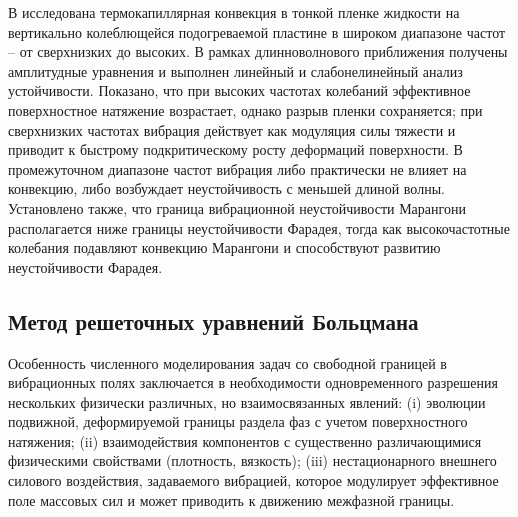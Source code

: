 \documentclass[12pt,a4paper]{article}
\begin{document}
В \cite{Shklyaev2015} исследована термокапиллярная конвекция в тонкой пленке жидкости на вертикально колеблющейся подогреваемой пластине в широком диапазоне частот -- от сверхнизких до высоких. В рамках длинноволнового приближения получены амплитудные уравнения и выполнен линейный и слабонелинейный анализ устойчивости. Показано, что при высоких частотах колебаний эффективное поверхностное натяжение возрастает, однако разрыв пленки сохраняется; при сверхнизких частотах вибрация действует как модуляция силы тяжести и приводит к быстрому подкритическому росту деформаций поверхности. В промежуточном диапазоне частот вибрация либо практически не влияет на конвекцию, либо возбуждает неустойчивость с меньшей длиной волны. Установлено также, что граница вибрационной неустойчивости Марангони располагается ниже границы неустойчивости Фарадея, тогда как высокочастотные колебания подавляют конвекцию Марангони и способствуют развитию неустойчивости Фарадея.


\newpage


\subsection{Метод решеточных уравнений Больцмана}

Особенность численного моделирования задач со свободной границей в вибрационных полях заключается в необходимости одновременного разрешения нескольких физически различных, но взаимосвязанных явлений: (i) эволюции подвижной, деформируемой границы раздела фаз с учетом поверхностного натяжения; (ii) взаимодействия компонентов с существенно различающимися физическими свойствами (плотность, вязкость); (iii) нестационарного внешнего силового воздействия, задаваемого вибрацией, которое модулирует эффективное поле массовых сил и может приводить к движению межфазной границы.
\end{document}
